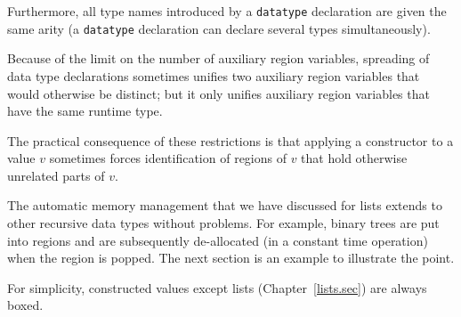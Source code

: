 \documentclass[12pt]{book}
\begin{document}
Furthermore, all type names introduced by a {\tt datatype} declaration are
given the same arity (a {\tt datatype} declaration can declare several
types simultaneously).

Because of the limit on the number of  auxiliary region variables, 
spreading of data type declarations sometimes unifies
two auxiliary region variables that would otherwise be distinct; 
but it only unifies auxiliary region
variables that have the same runtime type. 

The practical consequence of these restrictions is that 
applying a constructor to a value $v$ sometimes forces identification of regions
of $v$ that hold otherwise unrelated parts of $v$.

The automatic memory management that we have discussed for lists extends to
other recursive data types without problems. For example, binary trees
are put into regions and are subsequently de-allocated (in a constant time operation) when
the region is popped. The next section is an example 
to illustrate the point.

For simplicity, constructed values except lists 
(Chapter~\ref{lists.sec}) are always boxed. 
\end{document}
